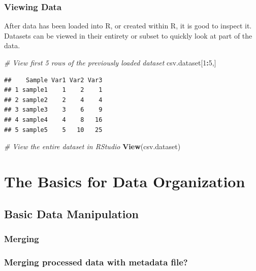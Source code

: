 \documentclass[
]{book}
\newenvironment{Shaded}{\begin{snugshade}}{\end{snugshade}}
\newcommand{\CommentTok}[1]{\textcolor[rgb]{0.56,0.35,0.01}{\textit{#1}}}
\newcommand{\DecValTok}[1]{\textcolor[rgb]{0.00,0.00,0.81}{#1}}
\newcommand{\KeywordTok}[1]{\textcolor[rgb]{0.13,0.29,0.53}{\textbf{#1}}}
\newcommand{\NormalTok}[1]{#1}
\newcommand{\OperatorTok}[1]{\textcolor[rgb]{0.81,0.36,0.00}{\textbf{#1}}}
\begin{document}
\hypertarget{viewing-data}{%
\subsection{Viewing Data}\label{viewing-data}}

After data has been loaded into R, or created within R, it is good to inspect it. Datasets can be viewed in their entirety or subset to quickly look at part of the data.

\begin{Shaded}
\begin{Highlighting}[]
\CommentTok{# View first 5 rows of the previously loaded dataset}
\NormalTok{csv.dataset[}\DecValTok{1}\OperatorTok{:}\DecValTok{5}\NormalTok{,]}
\end{Highlighting}
\end{Shaded}

\begin{verbatim}
##    Sample Var1 Var2 Var3
## 1 sample1    1    2    1
## 2 sample2    2    4    4
## 3 sample3    3    6    9
## 4 sample4    4    8   16
## 5 sample5    5   10   25
\end{verbatim}

\begin{Shaded}
\begin{Highlighting}[]
\CommentTok{# View the entire dataset in RStudio}
\KeywordTok{View}\NormalTok{(csv.dataset)}
\end{Highlighting}
\end{Shaded}

\hypertarget{dataorg}{%
\chapter{The Basics for Data Organization}\label{dataorg}}

\hypertarget{basic-data-manipulation}{%
\section{Basic Data Manipulation}\label{basic-data-manipulation}}

\hypertarget{merging}{%
\subsection{Merging}\label{merging}}

\hypertarget{merging-processed-data-with-metadata-file}{%
\subsection{Merging processed data with metadata file?}\label{merging-processed-data-with-metadata-file}}
\end{document}
